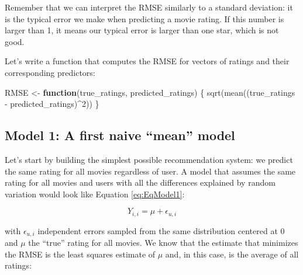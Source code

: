 \documentclass[
]{article}
\newenvironment{Shaded}{}{}
\newcommand{\ControlFlowTok}[1]{\textcolor[rgb]{0.00,0.44,0.13}{\textbf{#1}}}
\newcommand{\DecValTok}[1]{\textcolor[rgb]{0.25,0.63,0.44}{#1}}
\newcommand{\FloatTok}[1]{\textcolor[rgb]{0.25,0.63,0.44}{#1}}
\newcommand{\FunctionTok}[1]{\textcolor[rgb]{0.02,0.16,0.49}{#1}}
\newcommand{\NormalTok}[1]{#1}
\newcommand{\OtherTok}[1]{\textcolor[rgb]{0.00,0.44,0.13}{#1}}
\newcommand{\SpecialCharTok}[1]{\textcolor[rgb]{0.25,0.44,0.63}{#1}}
\begin{document}
Remember that we can interpret the RMSE similarly to a standard
deviation: it is the typical error we make when predicting a movie
rating. If this number is larger than 1, it means our typical error is
larger than one star, which is not good.

Let's write a function that computes the RMSE for vectors of ratings and
their corresponding predictors:

\begin{Shaded}
\begin{Highlighting}[]
\NormalTok{RMSE }\OtherTok{\textless{}{-}} \ControlFlowTok{function}\NormalTok{(true\_ratings, predicted\_ratings) \{}
    \FunctionTok{sqrt}\NormalTok{(}\FunctionTok{mean}\NormalTok{((true\_ratings }\SpecialCharTok{{-}}\NormalTok{ predicted\_ratings)}\SpecialCharTok{\^{}}\DecValTok{2}\NormalTok{))}
\NormalTok{\}}
\end{Highlighting}
\end{Shaded}

\newpage

\hypertarget{model-1-a-first-naive-mean-model}{%
\subsection{Model 1: A first naive ``mean''
model}\label{model-1-a-first-naive-mean-model}}

Let's start by building the simplest possible recommendation system: we
predict the same rating for all movies regardless of user. A model that
assumes the same rating for all movies and users with all the
differences explained by random variation would look like Equation
\ref{eq:EqModel1}:

%
\par

\label{eq:EqModel1} \begin{equation}
  Y_{i,i} = \mu + \epsilon_{u,i}
\end{equation}

with \(\epsilon_{u,i}\) independent errors sampled from the same
distribution centered at 0 and \(\mu\) the ``true'' rating for all
movies. We know that the estimate that minimizes the RMSE is the least
squares estimate of \(\mu\) and, in this case, is the average of all
ratings:

\begin{Shaded}
\end{Shaded}
\end{document}
